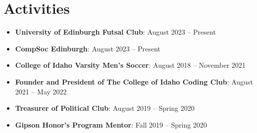 \documentclass[letterpaper,11pt]{article}
\newcommand{\resumeSubItem}[2]{
  \item\small{\textbf{#1}{: #2 \vspace{-6pt}}
  }
}
\newcommand{\resumeSubHeadingListStart}{\begin{itemize}[leftmargin=*]}
\newcommand{\resumeSubHeadingListEnd}{\end{itemize}}
\begin{document}
\section{Activities}
  \resumeSubHeadingListStart
    \resumeSubItem{University of Edinburgh Futsal Club}
      {August 2023 -- Present}
    \resumeSubItem{CompSoc Edinburgh}
      {August 2023 -- Present}
    \resumeSubItem{College of Idaho Varsity Men's Soccer}
      {August 2018 -- November 2021}
    \resumeSubItem{Founder and President of The College of Idaho Coding Club}
      {August 2021 -- May 2022}
    \resumeSubItem{Treasurer of Political Club}
      {August 2019 -- Spring 2020}
    \resumeSubItem{Gipson Honor's Program Mentor}
      {Fall 2019 -- Spring 2020}
  \resumeSubHeadingListEnd
\end{document}
